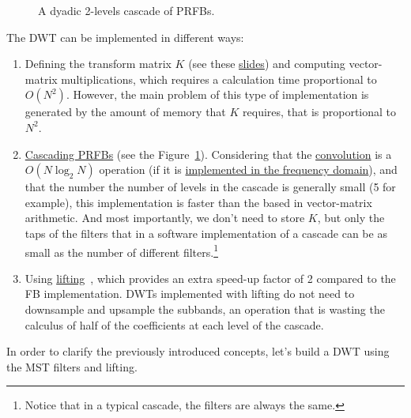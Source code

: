 \begin{figure}
  \centering
  \caption{A dyadic 2-levels cascade of PRFBs.}
  \label{fig:cascade}
\end{figure}

The DWT can be implemented in different ways:
\begin{enumerate}
\item Defining the transform matrix $K$ (see these
  \href{https://cseweb.ucsd.edu/classes/fa17/cse166-a/lec13.pdf}{slides})
  and computing vector-matrix multiplications, which requires a
  calculation time proportional to $O(N^2)$. However, the main problem
  of this type of implementation is generated by the amount of memory
  that $K$ requires, that is proportional to $N^2$.
\item
  \href{https://en.wikipedia.org/wiki/Discrete_wavelet_transform#Cascading_and_filter_banks}{Cascading
    PRFBs} (see the Figure~\ref{fig:cascade}). Considering that the
  \href{https://en.wikipedia.org/wiki/Convolution}{convolution} is a
  $O(N\log_2N)$ operation (if it is
  \href{https://en.wikipedia.org/wiki/Convolution_theorem}{implemented
    in the frequency domain}), and that the number the number of
  levels in the cascade is generally small (5 for example), this
  implementation is faster than the based in vector-matrix
  arithmetic. And most importantly, we don't need to store $K$, but
  only the taps of the filters that in a software implementation of a
  cascade can be as small as the number of different
  filters.\footnote{Notice that in a typical cascade, the filters are
    always the same.}
\item Using
  \href{https://en.wikipedia.org/wiki/Lifting_scheme}{lifting}~\cite{sweldens1997building},
  which provides an extra speed-up factor of 2 compared to the FB
  implementation. DWTs implemented with lifting do not need to
  downsample and upsample the subbands, an operation that is wasting
  the calculus of half of the coefficients at each level of the
  cascade.
\end{enumerate}

In order to clarify the previously introduced concepts, let's build a DWT using
the MST filters and lifting.

